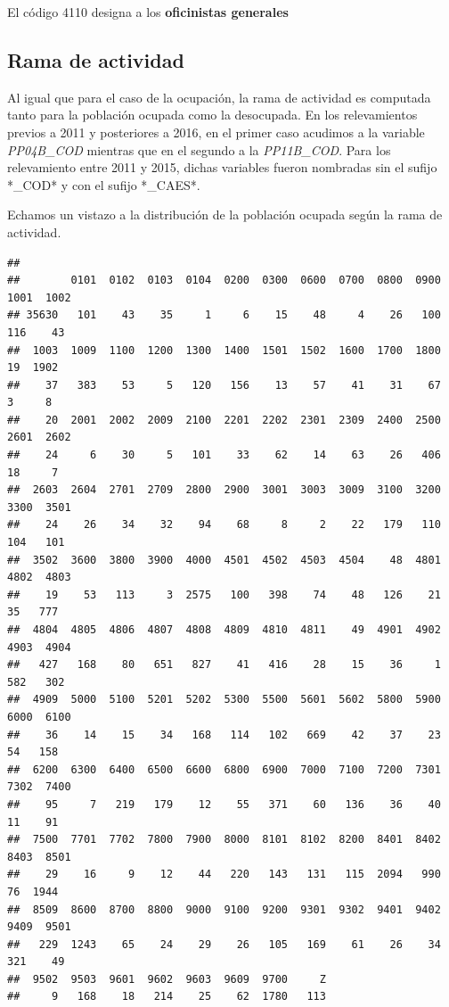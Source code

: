 \documentclass[
]{book}
\newenvironment{Shaded}{\begin{snugshade}}{\end{snugshade}}
\newcommand{\FunctionTok}[1]{\textcolor[rgb]{0.00,0.00,0.00}{#1}}
\newcommand{\NormalTok}[1]{#1}
\newcommand{\SpecialCharTok}[1]{\textcolor[rgb]{0.00,0.00,0.00}{#1}}
\begin{document}
El código 4110 designa a los \textbf{oficinistas generales}

\hypertarget{rama-de-actividad-1}{%
\subsection{Rama de actividad}\label{rama-de-actividad-1}}

Al igual que para el caso de la ocupación, la rama de actividad es computada tanto para la población ocupada como la desocupada. En los relevamientos previos a 2011 y posteriores a 2016, en el primer caso acudimos a la variable \emph{PP04B\_COD} mientras que en el segundo a la \emph{PP11B\_COD}. Para los relevamiento entre 2011 y 2015, dichas variables fueron nombradas sin el sufijo *\_COD* y con el sufijo *\_CAES*.

Echamos un vistazo a la distribución de la población ocupada según la rama de actividad.

\begin{Shaded}
\end{Shaded}

\begin{verbatim}
## 
##        0101  0102  0103  0104  0200  0300  0600  0700  0800  0900  1001  1002 
## 35630   101    43    35     1     6    15    48     4    26   100   116    43 
##  1003  1009  1100  1200  1300  1400  1501  1502  1600  1700  1800    19  1902 
##    37   383    53     5   120   156    13    57    41    31    67     3     8 
##    20  2001  2002  2009  2100  2201  2202  2301  2309  2400  2500  2601  2602 
##    24     6    30     5   101    33    62    14    63    26   406    18     7 
##  2603  2604  2701  2709  2800  2900  3001  3003  3009  3100  3200  3300  3501 
##    24    26    34    32    94    68     8     2    22   179   110   104   101 
##  3502  3600  3800  3900  4000  4501  4502  4503  4504    48  4801  4802  4803 
##    19    53   113     3  2575   100   398    74    48   126    21    35   777 
##  4804  4805  4806  4807  4808  4809  4810  4811    49  4901  4902  4903  4904 
##   427   168    80   651   827    41   416    28    15    36     1   582   302 
##  4909  5000  5100  5201  5202  5300  5500  5601  5602  5800  5900  6000  6100 
##    36    14    15    34   168   114   102   669    42    37    23    54   158 
##  6200  6300  6400  6500  6600  6800  6900  7000  7100  7200  7301  7302  7400 
##    95     7   219   179    12    55   371    60   136    36    40    11    91 
##  7500  7701  7702  7800  7900  8000  8101  8102  8200  8401  8402  8403  8501 
##    29    16     9    12    44   220   143   131   115  2094   990    76  1944 
##  8509  8600  8700  8800  9000  9100  9200  9301  9302  9401  9402  9409  9501 
##   229  1243    65    24    29    26   105   169    61    26    34   321    49 
##  9502  9503  9601  9602  9603  9609  9700     Z 
##     9   168    18   214    25    62  1780   113
\end{verbatim}
\end{document}
